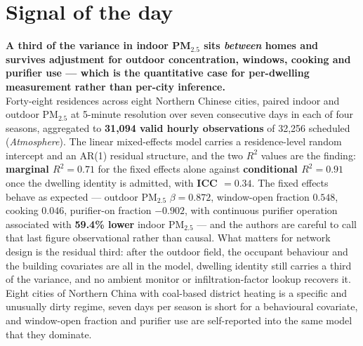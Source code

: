 \documentclass[10pt]{article}
\begin{document}
\vspace{6mm}

\section*{\sffamily\bfseries\color{Deep}Signal of the day}
\vspace{-1.5mm}{\color{Amber}\rule{\linewidth}{1.1pt}}\vspace{2.5mm}

\begin{keybox}
{\sffamily\bfseries\small\color{Deep}A third of the variance in indoor PM$_{2.5}$ sits
\emph{between} homes and survives adjustment for outdoor concentration, windows, cooking and
purifier use --- which is the quantitative case for per-dwelling measurement rather than
per-city inference.}\\[1.4mm]
\footnotesize
Forty-eight residences across eight Northern Chinese cities, paired indoor and outdoor
PM$_{2.5}$ at 5-minute resolution over seven consecutive days in each of four seasons,
aggregated to \textbf{31{,}094 valid hourly observations} of 32{,}256 scheduled
(\textit{Atmosphere}). The linear mixed-effects model carries a residence-level random
intercept and an AR(1) residual structure, and the two $R^2$ values are the finding:
\textbf{marginal $R^2=0.71$} for the fixed effects alone against \textbf{conditional
$R^2=0.91$} once the dwelling identity is admitted, with \textbf{ICC $=0.34$}. The fixed
effects behave as expected --- outdoor PM$_{2.5}$ $\beta=0.872$, window-open fraction
$0.548$, cooking $0.046$, purifier-on fraction $-0.902$, with continuous purifier operation
associated with \textbf{59.4\% lower} indoor PM$_{2.5}$ --- and the authors are careful to
call that last figure observational rather than causal. What matters for network design is
the residual third: after the outdoor field, the occupant behaviour and the building
covariates are all in the model, dwelling identity still carries a third of the variance,
and no ambient monitor or infiltration-factor lookup recovers it. Eight cities of Northern
China with coal-based district heating is a specific and unusually dirty regime, seven days
per season is short for a behavioural covariate, and window-open fraction and purifier use
are self-reported into the same model that they dominate.\par
\end{keybox}

\end{document}
